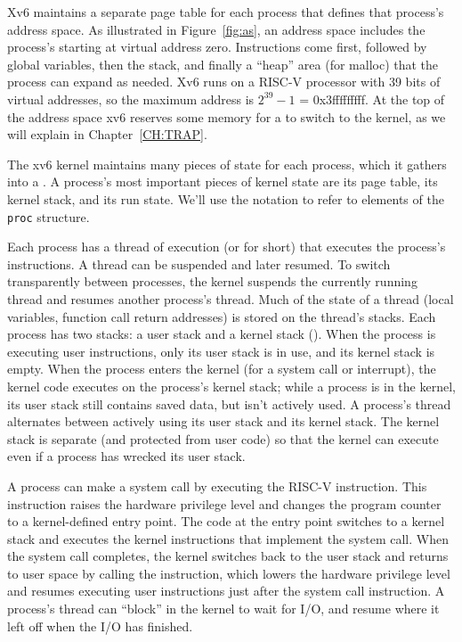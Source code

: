 Xv6 maintains a separate page table for each process that defines that process's
address space.  As illustrated in 
Figure~\ref{fig:as},
an address space includes the process's
starting at virtual address zero. Instructions come first,
followed by global variables, then the stack,
and finally a ``heap'' area (for malloc)
that the process can expand as needed.
Xv6 runs on a RISC-V processor with 39 bits of virtual addresses,
so the maximum address is $2^{39}-1$ = 0x3fffffffff.
At the top of the address space xv6 reserves some
memory for a 
to switch to the kernel, as we will explain in Chapter~\ref{CH:TRAP}.

The xv6 kernel maintains many pieces of state for each process,
which it gathers into a
.
A process's most important pieces of kernel state are its 
page table, its kernel stack, and its run state.
We'll use the notation
to refer to elements of the
\lstinline{proc}
structure.

Each process has a thread of execution (or 
for short) that executes the process's instructions.
A thread can be suspended and later resumed.
To switch transparently between processes,
the kernel suspends the currently running thread and resumes another process's
thread.  Much of the state of a thread (local variables, function call return
addresses) is stored on the thread's stacks.
Each process has two stacks: a user stack and a kernel stack
().
When the process is executing user instructions, only its user stack
is in use, and its kernel stack is empty.
When the process enters the kernel (for a system call or interrupt),
the kernel code executes on the process's kernel stack; while
a process is in the kernel, its user stack still contains saved
data, but isn't actively used.
A process's thread alternates between actively using its user stack
and its kernel stack. The kernel stack is separate (and protected from
user code) so that the kernel
can execute even if a process has wrecked its user stack.

A process can make a system call by executing the RISC-V 
instruction. This instruction raises the hardware privilege level and
changes the program counter to a kernel-defined entry point.  The code
at the entry point switches to a kernel stack and executes the kernel
instructions that implement the system call.  When the system call
completes, the kernel switches back to the user stack and returns to
user space by calling the  instruction, which lowers
the hardware privilege level and resumes executing user instructions
just after the system call instruction.  A process's thread can
``block'' in the kernel to wait for I/O, and resume where it left off
when the I/O has finished.

